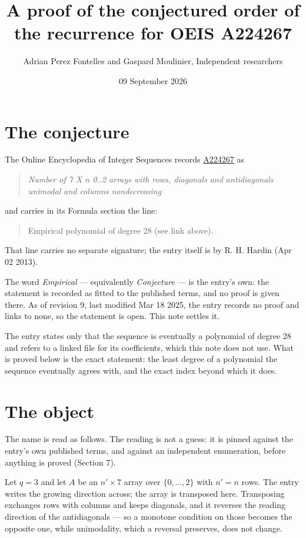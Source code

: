 \documentclass[11pt]{article}
\title{A proof of the conjectured order of the recurrence for OEIS A224267}
\author{Adrian Perez Fontelles and Gaspard Moulinier, Independent researchers}
\date{09 September 2026}
\theoremstyle{definition}
\begin{document}
\maketitle
\section{The conjecture}

The Online Encyclopedia of Integer Sequences records \href{https://oeis.org/A224267}{A224267} as

\begin{quote}\itshape Number of 7 X n 0..2 arrays with rows, diagonals and antidiagonals unimodal and columns nondecreasing\end{quote}

and carries in its Formula section the line:

\begin{quote}\ttfamily Empirical polynomial of degree 28 (see link above).\end{quote}

That line carries no separate signature; the entry itself is by R. H. Hardin (Apr 02 2013).

The word {\itshape Empirical} --- equivalently {\itshape Conjecture} --- is the entry's own: the statement is recorded as fitted to the published terms, and no proof is given there. As of revision 9, last modified Mar 18 2025, the entry records no proof and links to none, so the statement is open. This note settles it.

The entry states only that the sequence is eventually a polynomial of degree $28$ and refers to a linked file for its coefficients, which this note does not use. What is proved below is the exact statement: the least degree of a polynomial the sequence eventually agrees with, and the exact index beyond which it does.

\section{The object}

The name is read as follows. The reading is not a guess: it is pinned against the entry's own published terms, and against an independent enumeration, before anything is proved (Section 7).

Let $q = 3$ and let $A$ be an $n' \times 7$ array over $\{0,\dots,2\}$ with $n' = n$ rows. The entry writes the growing direction across; the array is transposed here. Transposing exchanges rows with columns and keeps diagonals, and it reverses the reading direction of the antidiagonals --- so a monotone condition on those becomes the opposite one, while unimodality, which a reversal preserves, does not change.
\end{document}
